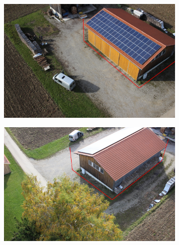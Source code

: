 \documentclass[remotesensing,article,accept,moreauthors,pdftex,10pt,a4paper]{mdpi}
\theoremstyle{mdpi}
\newcounter{ex}
\newcounter{re}
\begin{document}
\begin{figure}[H]
    \centering
       \begin{subfigure}[tbp]{0.31\columnwidth}
           \centering
           \includegraphics[width=\textwidth]{optimize/IMG_0735_osm_ori.png}
           \caption[]{}%
           {{\small }}
           \label{fig:5a}
       \end{subfigure} 
       \begin{subfigure}[tbp]{0.31\columnwidth}  
           \centering 
           \includegraphics[width=\textwidth]{optimize/IMG_0765_osm_ori.png}
           \caption[]{}%
           {{\small }}    
           \label{fig:5b}
       \end{subfigure}
       \begin{subfigure}[tbp]{0.31\columnwidth}  
           \centering 

\end{subfigure}
\end{figure}
\end{document}
